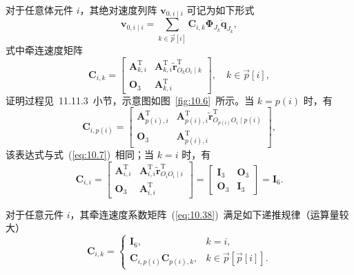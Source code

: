 对于任意体元件 $i$，其绝对速度列阵 $\boldsymbol{v}_{0,i \mid i}$ 可记为如下形式
\begin{equation}\label{eq:10.37}
  \boldsymbol{v}_{0,i \mid i} = \sum_{k \in \vec{p}[i]} \boldsymbol{C}_{i,k} \boldsymbol{\Phi}_{J_k} \dot{\boldsymbol{q}}_{J_k},
\end{equation}
式中牵连速度矩阵
\begin{equation}\label{eq:10.38}
  \boldsymbol{C}_{i,k} = \begin{bmatrix}
    \boldsymbol{A}_{k,i}^{\mathrm{T}} & \boldsymbol{A}_{k,i}^{\mathrm{T}} \tilde{\boldsymbol{r}}_{O_k O_i \mid k}^{\mathrm{T}} \\
    \boldsymbol{O}_3 & \boldsymbol{A}_{k,i}^{\mathrm{T}}
  \end{bmatrix}, \quad k \in \vec{p}[i],
\end{equation}
证明过程见~11.11.3~小节，示意图如图~\ref{fig:10.6}~所示。当 $k = p(i)$ 时，有
\begin{equation}\label{eq:10.39}
  \boldsymbol{C}_{i,p(i)} = \begin{bmatrix}
    \boldsymbol{A}_{p(i),i}^{\mathrm{T}} & \boldsymbol{A}_{p(i),i}^{\mathrm{T}} \tilde{\boldsymbol{r}}_{O_{p(i)} O_i \mid p(i)}^{\mathrm{T}} \\
    \boldsymbol{O}_3 & \boldsymbol{A}_{p(i),i}^{\mathrm{T}}
  \end{bmatrix},
\end{equation}
该表达式与式~(\ref{eq:10.7})~相同；当 $k = i$ 时，有
\begin{equation}\label{eq:10.40}
  \boldsymbol{C}_{i,i} = \begin{bmatrix}
    \boldsymbol{A}_{i,i}^{\mathrm{T}} & \boldsymbol{A}_{i,i}^{\mathrm{T}} \tilde{\boldsymbol{r}}_{O_i O_i \mid i}^{\mathrm{T}} \\
    \boldsymbol{O}_3 & \boldsymbol{A}_{i,i}^{\mathrm{T}}
  \end{bmatrix}
  = \begin{bmatrix} \boldsymbol{I}_3 & \boldsymbol{O}_3 \\ \boldsymbol{O}_3 & \boldsymbol{I}_3 \end{bmatrix}
  = \boldsymbol{I}_6.
\end{equation}

对于任意元件 $i$，其牵连速度系数矩阵~(\ref{eq:10.38})~满足如下递推规律（运算量较大）
\begin{equation}\label{eq:10.41}
  \boldsymbol{C}_{i,k} = \begin{cases}
    \boldsymbol{I}_6, & k = i, \\
    \boldsymbol{C}_{i,p(i)} \boldsymbol{C}_{p(i),k}, & k \in \vec{p}[\vec{p}[i]].
  \end{cases}
\end{equation}

